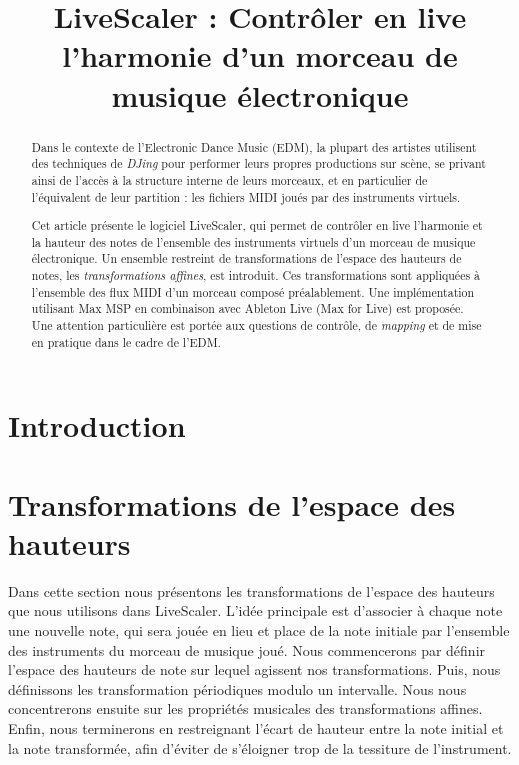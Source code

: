 \documentclass{article}
\title{LiveScaler : Contrôler en live l'harmonie d'un morceau de musique électronique}
\begin{document}
  

\maketitle

\sloppy

\begin{abstract}
Dans le contexte de l'Electronic Dance Music (EDM), la plupart des artistes utilisent des techniques de \emph{DJing} pour performer leurs propres productions sur scène, se privant ainsi de l'accès à la structure interne de leurs morceaux, et en particulier de l'équivalent de leur partition : les fichiers MIDI joués par des instruments virtuels.

Cet article présente le logiciel LiveScaler, qui permet de contrôler en live l'harmonie et la hauteur des notes de l'ensemble des instruments virtuels d'un morceau de musique électronique. Un ensemble restreint de transformations de l'espace des hauteurs de notes, les \emph{transformations affines}, est introduit. Ces transformations sont appliquées à l'ensemble des flux MIDI d'un morceau composé préalablement. Une implémentation utilisant Max MSP en combinaison avec Ableton Live (Max for Live) est proposée. Une attention particulière est portée aux questions de contrôle, de \emph{mapping} et de mise en pratique dans le cadre de l'EDM.
\end{abstract}

\section{Introduction}

\section{Transformations de l'espace des hauteurs}
Dans cette section nous présentons les transformations de l'espace des hauteurs que nous utilisons dans LiveScaler. L'idée principale est d'associer à chaque note une nouvelle note, qui sera jouée en lieu et place de la note initiale par l'ensemble des instruments du morceau de musique joué. Nous commencerons par définir l'espace des hauteurs de note sur lequel agissent nos transformations. Puis, nous définissons les transformation périodiques modulo un intervalle. Nous nous concentrerons ensuite sur les propriétés musicales des transformations affines. Enfin, nous terminerons en restreignant l'écart de hauteur entre la note initial et la note transformée, afin d'éviter de s'éloigner trop de la tessiture de l'instrument.
\end{document}
